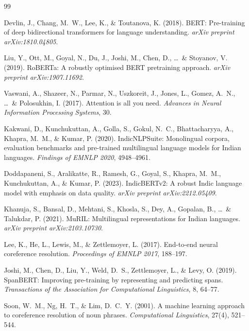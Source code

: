 \documentclass[12pt,a4paper]{report}
\begin{document}
\begin{thebibliography}{99}

Devlin, J., Chang, M.\ W., Lee, K., \& Toutanova, K. (2018).
BERT: Pre-training of deep bidirectional transformers for language understanding.
\textit{arXiv preprint arXiv:1810.04805}.

Liu, Y., Ott, M., Goyal, N., Du, J., Joshi, M., Chen, D., \ldots\ \& Stoyanov, V. (2019).
RoBERTa: A robustly optimised BERT pretraining approach.
\textit{arXiv preprint arXiv:1907.11692}.

Vaswani, A., Shazeer, N., Parmar, N., Uszkoreit, J., Jones, L., Gomez, A.\ N., \ldots\ \& Polosukhin, I. (2017).
Attention is all you need.
\textit{Advances in Neural Information Processing Systems}, 30.

Kakwani, D., Kunchukuttan, A., Golla, S., Gokul, N.\ C., Bhattacharyya, A., Khapra, M.\ M., \& Kumar, P. (2020).
IndicNLPSuite: Monolingual corpora, evaluation benchmarks and pre-trained multilingual language models for Indian languages.
\textit{Findings of EMNLP 2020}, 4948--4961.

Doddapaneni, S., Aralikatte, R., Ramesh, G., Goyal, S., Khapra, M.\ M., Kunchukuttan, A., \& Kumar, P. (2023).
IndicBERTv2: A robust Indic language model with emphasis on data quality.
\textit{arXiv preprint arXiv:2212.05409}.

Khanuja, S., Bansal, D., Mehtani, S., Khosla, S., Dey, A., Gopalan, B., \ldots\ \& Talukdar, P. (2021).
MuRIL: Multilingual representations for Indian languages.
\textit{arXiv preprint arXiv:2103.10730}.

Lee, K., He, L., Lewis, M., \& Zettlemoyer, L. (2017).
End-to-end neural coreference resolution.
\textit{Proceedings of EMNLP 2017}, 188--197.

Joshi, M., Chen, D., Liu, Y., Weld, D.\ S., Zettlemoyer, L., \& Levy, O. (2019).
SpanBERT: Improving pre-training by representing and predicting spans.
\textit{Transactions of the Association for Computational Linguistics}, 8, 64--77.

Soon, W.\ M., Ng, H.\ T., \& Lim, D.\ C.\ Y. (2001).
A machine learning approach to coreference resolution of noun phrases.
\textit{Computational Linguistics}, 27(4), 521--544.


\end{thebibliography}
\end{document}
